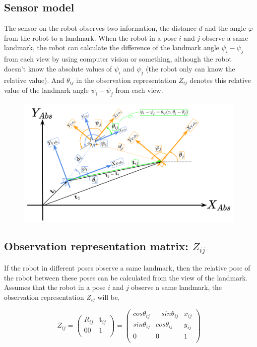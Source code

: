 \documentclass{article}
\begin{document}
\newpage

\subsection{Sensor model}

The sensor on the robot observes two information, the distance $d$ and the angle $\varphi$ from the robot to a landmark.
When the robot in a pose $i$ and $j$ observe a same landmark, the robot can calculate the difference of the landmark angle $\psi_i - \psi_j$ from each view by using computer vision or something, although the robot doesn't know the absolute values of $\psi_i$ and $\psi_j$ (the robot only can know the relative value).
And $\theta_{ij}$ in the observation representation $Z_{ij}$ denotes this relative value of the landmark angle $\psi_i - \psi_j$ from each view.

\begin{figure}[h!]
  \centering
  \includegraphics[width=\textwidth]{2-7_sensor_model.png}
\end{figure}

\subsection{Observation representation matrix: $Z_{ij}$}

If the robot in different poses observe a same landmark, then the relative pose of the robot between these poses can be calculated from the view of the landmark.
Assumes that the robot in a pose $i$ and $j$ observe a same landmark, the observation representation $Z_{ij}$ will be,

\[
Z_{ij} =
\left(
  \begin{array}{ccc}
    R_{ij} & \bm{t}_{ij} \\
       00 &              1 \\
  \end{array}
\right)
=
\left(
  \begin{array}{ccc}
    cos\theta_{ij} & -sin\theta_{ij} & x_{ij} \\
    sin\theta_{ij} &  cos\theta_{ij} & y_{ij} \\
                0 &                0 &      1 \\
  \end{array}
\right)
\]
\end{document}
